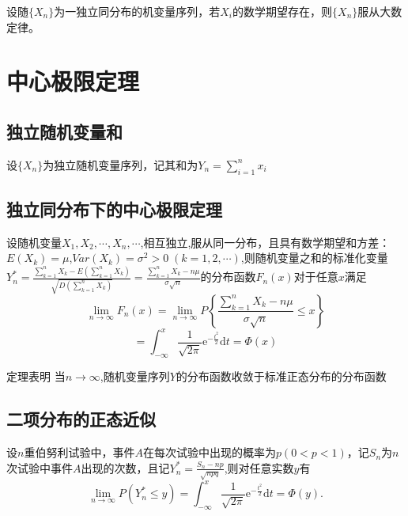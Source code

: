 \begin{theorem}[辛钦大数定律]
    设随$\{X_n\}$为一独立同分布的机变量序列，若$X_i$的数学期望存在，则$\{X_n\}$服从大数定律。
\end{theorem}

\section{中心极限定理}
\subsection{独立随机变量和}
\begin{definition}
    设$\{X_n\}$为独立随机变量序列，记其和为$Y_n=\sum_{i=1}^n x_i$
\end{definition}


\subsection{独立同分布下的中心极限定理}

\begin{theorem}
    设随机变量${X_1},{X_2}, \cdots ,{X_n}, \cdots $,相互独立,服从同一分布，且具有数学期望和方差：$E({X_k}) = \mu $,$Var({X_k}) = {\sigma ^2} > 0\;(k = 1,2, \cdots )$,则随机变量之和的标准化变量${Y_n^*} = \frac{{\sum\limits_{k = 1}^n {{X_k}}  - E\left( {\sum\limits_{k = 1}^n {{X_k}} } \right)}}{{\sqrt {D\left( {\sum\limits_{k = 1}^n {{X_k}} } \right)} }}=\frac{{\sum\limits_{k = 1}^n {{X_k}}  - n\mu }}{{\sigma \sqrt n }}$的分布函数${F_n}(x)$对于任意$x$满足$$\mathop {\lim }\limits_{n \to \infty } {F_n}(x) = \mathop {\lim }\limits_{n \to \infty } P\left\{ {\frac{{\sum\limits_{k = 1}^n {{X_k}}  - n\mu }}{{\sigma \sqrt n }} \leqslant x} \right\}$$$$ = \int_{ - \infty }^x {\frac{1}{{\sqrt {2\pi } }}{{\text{e}}^{ - \frac{{{t^2}}}{2}}}{\text{d}}t = \Phi (x)} $$
\end{theorem}

定理表明 当$n \to \infty $,随机变量序列$Y$的分布函数收敛于标准正态分布的分布函数

\subsection{二项分布的正态近似}
\begin{theorem}
    设$n$重伯努利试验中，事件$A$在每次试验中出现的概率为$p(0 < p < 1)$，记$S_n$为$n$次试验中事件$A$出现的次数，且记$Y_n^*={\frac{{S_n - np}}{{\sqrt {npq} }}}$,则对任意实数$y$有
    $$\mathop {\lim }\limits_{n \to \infty } P(Y_n^* \leqslant y)=\int_{ - \infty }^x {\frac{1}{{\sqrt {2{\pi }} }}{{\text{e}}^{ - \frac{{{t^2}}}{2}}}{\text{d}}t = \Phi (y).} $$

\end{theorem}

